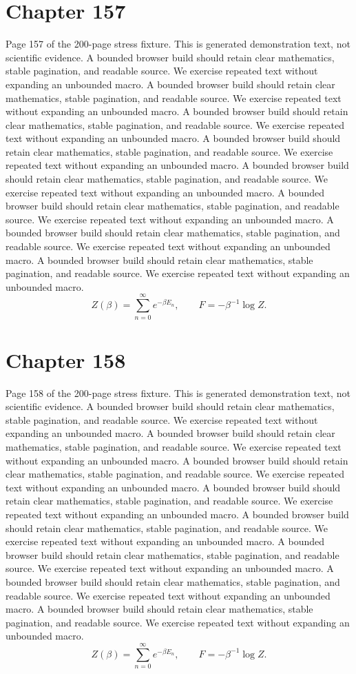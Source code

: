 \documentclass[11pt]{article}
\begin{document}
\section*{Chapter 157}
Page 157 of the 200-page stress fixture. This is generated demonstration text, not scientific evidence.
A bounded browser build should retain clear mathematics, stable pagination, and readable source. We exercise repeated text without expanding an unbounded macro.
A bounded browser build should retain clear mathematics, stable pagination, and readable source. We exercise repeated text without expanding an unbounded macro.
A bounded browser build should retain clear mathematics, stable pagination, and readable source. We exercise repeated text without expanding an unbounded macro.
A bounded browser build should retain clear mathematics, stable pagination, and readable source. We exercise repeated text without expanding an unbounded macro.
A bounded browser build should retain clear mathematics, stable pagination, and readable source. We exercise repeated text without expanding an unbounded macro.
A bounded browser build should retain clear mathematics, stable pagination, and readable source. We exercise repeated text without expanding an unbounded macro.
A bounded browser build should retain clear mathematics, stable pagination, and readable source. We exercise repeated text without expanding an unbounded macro.
A bounded browser build should retain clear mathematics, stable pagination, and readable source. We exercise repeated text without expanding an unbounded macro.
\[Z(\beta)=\sum_{n=0}^{\infty}e^{-\beta E_n},\qquad F=-\beta^{-1}\log Z.\]
\newpage
\section*{Chapter 158}
Page 158 of the 200-page stress fixture. This is generated demonstration text, not scientific evidence.
A bounded browser build should retain clear mathematics, stable pagination, and readable source. We exercise repeated text without expanding an unbounded macro.
A bounded browser build should retain clear mathematics, stable pagination, and readable source. We exercise repeated text without expanding an unbounded macro.
A bounded browser build should retain clear mathematics, stable pagination, and readable source. We exercise repeated text without expanding an unbounded macro.
A bounded browser build should retain clear mathematics, stable pagination, and readable source. We exercise repeated text without expanding an unbounded macro.
A bounded browser build should retain clear mathematics, stable pagination, and readable source. We exercise repeated text without expanding an unbounded macro.
A bounded browser build should retain clear mathematics, stable pagination, and readable source. We exercise repeated text without expanding an unbounded macro.
A bounded browser build should retain clear mathematics, stable pagination, and readable source. We exercise repeated text without expanding an unbounded macro.
A bounded browser build should retain clear mathematics, stable pagination, and readable source. We exercise repeated text without expanding an unbounded macro.
\[Z(\beta)=\sum_{n=0}^{\infty}e^{-\beta E_n},\qquad F=-\beta^{-1}\log Z.\]
\newpage
\end{document}
